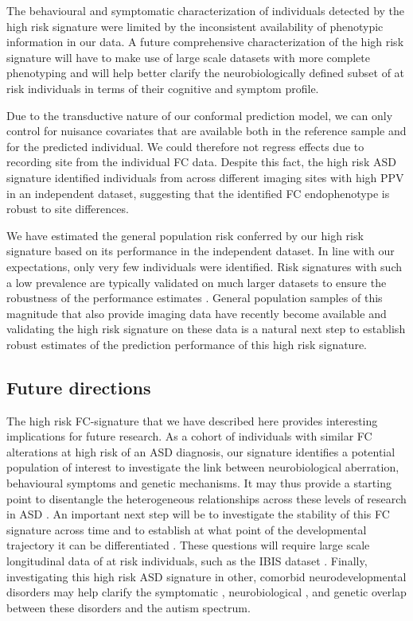 \documentclass[9pt,lineno]{elife}
\begin{document}
The behavioural and symptomatic characterization of individuals detected by the high risk signature were limited by the inconsistent availability of phenotypic information in our data. A future comprehensive characterization of the high risk signature will have to make use of large scale datasets with more complete phenotyping and will help better clarify the neurobiologically defined subset of at risk individuals in terms of their cognitive and symptom profile.

Due to the transductive nature of our conformal prediction model, we can only control for nuisance covariates that are available both in the reference sample and for the predicted individual. We could therefore not regress effects due to recording site from the individual FC data. Despite this fact, the high risk ASD signature identified individuals from across different imaging sites with high PPV in an independent dataset, suggesting that the identified FC endophenotype is robust to site differences.

We have estimated the general population risk conferred by our high risk signature based on its performance in the independent dataset. In line with our expectations, only very few individuals were identified. Risk signatures with such a low prevalence are typically validated on much larger datasets to ensure the robustness of the performance estimates \citep{Khera2018-of}. General population samples of this magnitude that also provide imaging data have recently become available \citep{Bycroft2018-se} and validating the high risk signature on these data is a natural next step to establish robust estimates of the prediction performance of this high risk signature.

\subsection{Future directions}
The high risk FC-signature that we have described here provides interesting implications for future research. As a cohort of individuals with similar FC alterations at high risk of an ASD diagnosis, our signature identifies a potential population of interest to investigate the link between neurobiological aberration, behavioural symptoms and genetic mechanisms. It may thus provide a starting point to disentangle the heterogeneous relationships across these levels of research in ASD \citep{Lombardo2019-mf}. An important next step will be to investigate the stability of this FC signature across time \citep{Jacob2019-zf} and to establish at what point of the developmental trajectory it can be differentiated \citep{Emerson2017-ne}. These questions will require large scale longitudinal data of at risk individuals, such as the IBIS dataset \citep{Wolff2012-vq}. Finally, investigating this high risk ASD signature in other, comorbid \citep{Simonoff2008-fr} neurodevelopmental disorders may help clarify the symptomatic \citep{Grzadzinski2011-rt}, neurobiological \citep{Van_den_Heuvel2019-ft,De_Lange2019-yy}, and genetic \citep{Cross-Disorder_Group_of_the_Psychiatric_Genomics_Consortium2013-au} overlap between these disorders and the autism spectrum.
\end{document}
